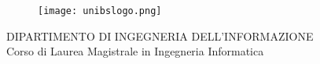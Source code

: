 \begin{titlepage}
\hypersetup{pageanchor=false}
\begin{figure}
  \centering
  \texttt{[image: unibslogo.png]}
\end{figure}
\centering
{}\selectfont
\large DIPARTIMENTO DI INGEGNERIA DELL'INFORMAZIONE\\
Corso di Laurea Magistrale in Ingegneria Informatica

\vspace*{23mm}

\end{titlepage}
\restoregeometry
